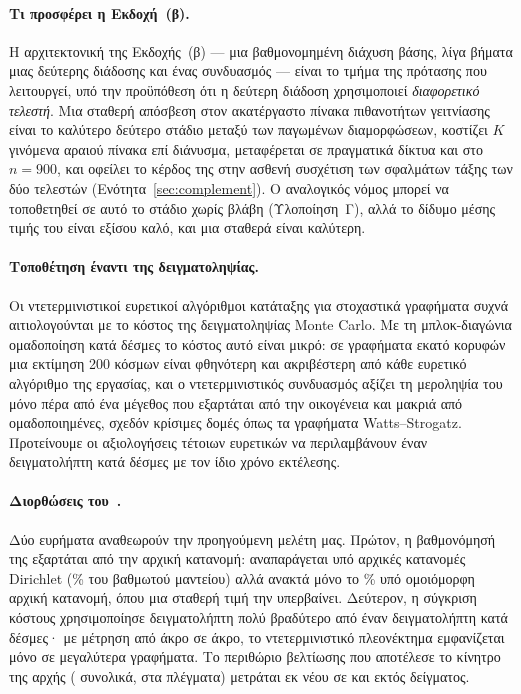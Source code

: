 \documentclass[11pt,a4paper]{article}
\theoremstyle{definition}
\theoremstyle{plain}
\begin{document}
\paragraph{Τι προσφέρει η Εκδοχή~(β).} Η αρχιτεκτονική της Εκδοχής~(β) --- μια βαθμονομημένη διάχυση βάσης, λίγα βήματα μιας δεύτερης διάδοσης και ένας συνδυασμός --- είναι το τμήμα της πρότασης που λειτουργεί, υπό την προϋπόθεση ότι η δεύτερη διάδοση χρησιμοποιεί \emph{διαφορετικό τελεστή}. Μια σταθερή απόσβεση στον ακατέργαστο πίνακα πιθανοτήτων γειτνίασης είναι το καλύτερο δεύτερο στάδιο μεταξύ των παγωμένων διαμορφώσεων, κοστίζει $K$ γινόμενα αραιού πίνακα επί διάνυσμα, μεταφέρεται σε πραγματικά δίκτυα και στο $n=900$, και οφείλει το κέρδος της στην ασθενή συσχέτιση των σφαλμάτων τάξης των δύο τελεστών (Ενότητα~\ref{sec:complement}). Ο αναλογικός νόμος μπορεί να τοποθετηθεί σε αυτό το στάδιο χωρίς βλάβη (Υλοποίηση~Γ), αλλά το δίδυμο μέσης τιμής του είναι εξίσου καλό, και μια σταθερά είναι καλύτερη.

\paragraph{Τοποθέτηση έναντι της δειγματοληψίας.} Οι ντετερμινιστικοί ευρετικοί αλγόριθμοι κατάταξης για στοχαστικά γραφήματα συχνά αιτιολογούνται με το κόστος της δειγματοληψίας Monte Carlo. Με τη μπλοκ-διαγώνια ομαδοποίηση κατά δέσμες το κόστος αυτό είναι μικρό: σε γραφήματα εκατό κορυφών μια εκτίμηση 200 κόσμων είναι φθηνότερη και ακριβέστερη από κάθε ευρετικό αλγόριθμο της εργασίας, και ο ντετερμινιστικός συνδυασμός αξίζει τη μεροληψία του μόνο πέρα από ένα μέγεθος που εξαρτάται από την οικογένεια και μακριά από ομαδοποιημένες, σχεδόν κρίσιμες δομές όπως τα γραφήματα Watts--Strogatz. Προτείνουμε οι αξιολογήσεις τέτοιων ευρετικών να περιλαμβάνουν έναν δειγματολήπτη κατά δέσμες με τον ίδιο χρόνο εκτέλεσης.

\paragraph{Διορθώσεις του~\cite{konstantellos26}.} Δύο ευρήματα αναθεωρούν την προηγούμενη μελέτη μας. Πρώτον, η βαθμονόμησή της εξαρτάται από την αρχική κατανομή: αναπαράγεται υπό αρχικές κατανομές Dirichlet (\RepPctDir\% του βαθμωτού μαντείου) αλλά ανακτά μόνο το \RepPctUnif\% υπό ομοιόμορφη αρχική κατανομή, όπου μια σταθερή τιμή την υπερβαίνει. Δεύτερον, η σύγκριση κόστους χρησιμοποίησε δειγματολήπτη πολύ βραδύτερο από έναν δειγματολήπτη κατά δέσμες· με μέτρηση από άκρο σε άκρο, το ντετερμινιστικό πλεονέκτημα εμφανίζεται μόνο σε μεγαλύτερα γραφήματα. Το περιθώριο βελτίωσης που αποτέλεσε το κίνητρο της αρχής (\PrevHeadAll{} συνολικά, \PrevHeadGrid{} στα πλέγματα) μετράται εκ νέου σε \HeadAll{} και \HeadGrid{} εκτός δείγματος.
\end{document}
